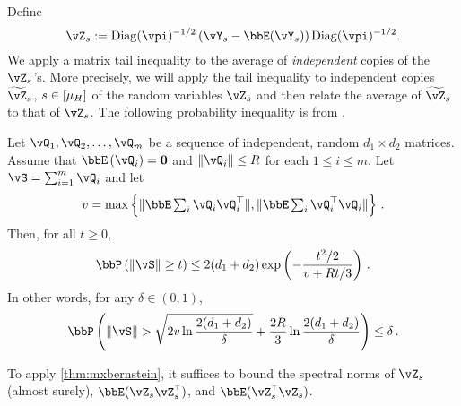 Define
\[
  \vZ_s
  := \Diag(\vpi)^{-1/2} \left( \vY_s 
  - \bbE(\vY_s) \right)\Diag(\vpi)^{-1/2}
  .
\]
We apply a matrix tail inequality to the average of \emph{independent}
copies of the $\vZ_s$'s.
More precisely, we will apply the tail inequality to independent
copies $\wt{\vZ}_s$, $s\in [\mu_H]$ of the random variables
$\vZ_s$ and then relate the average of $\wt{\vZ}_s$ to that of
$\vZ_s$.
The following probability inequality is from \citet[Theorem
6.1.1.]{tropp2015intro}.
\begin{theorem}
\label{thm:mxbernstein}
Let $\vQ_1,\vQ_2,\dotsc,\vQ_m$ be a sequence of independent, random
$d_1 \times d_2$ matrices.
Assume that $\EE{\vQ_i} = \v0$ and $\Norm{\vQ_i}\le R$ for each $1\le
i \le m$.
Let $\vS = \sum_{i=1}^m \vQ_i$ and let 
\begin{align*}
v = \max\left\{ \norm{\bbE \textstyle\sum_i \vQ_i \vQ_i^\top  }, 
						      \norm{\bbE \textstyle\sum_i \vQ_i^\top \vQ_i  }
			\right\}\,.
\end{align*}
Then, for all $t\ge 0$, 
\[
\bbP\left( \Norm{\vS} \ge t \right) \le 2(d_1 + d_2) \exp\left( -\frac{t^2/2}{v+R t/3}\right)\,.
\]
In other words, for any $\delta \in (0,1)$,
\[
  \bbP\Parens{
    \norm{\vS} > \sqrt{2 v \ln \frac{2(d_1+d_2)}{\delta}} + \frac{2R}{3}
    \ln\frac{2(d_1+d_2)}{\delta}
  } \leq \delta
  \,.
\]
\end{theorem}

To apply \cref{thm:mxbernstein}, it suffices to bound the spectral
norms of $\vZ_s$ (almost surely), $\bbE(\vZ_s \vZ_s^\t)$, and
$\bbE(\vZ_s^\t \vZ_s)$.

